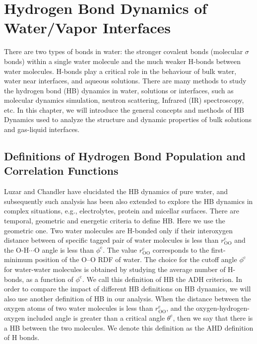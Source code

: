 \chapter{Hydrogen Bond Dynamics of Water/Vapor Interfaces }\label{CHAPTER_HB}
There are two types of bonds in water: the stronger covalent bonds (molecular $\sigma$ bonds) within a single water molecule and 
the much weaker H-bonds between water molecules.
H-bonds play a critical role in the behaviour of bulk water,\cite{Eisenberg1969,Luzar1996,Cabane2005} water near interfaces,\cite{Chowdhary2008} 
and aqueous solutions. \cite{Naslund2005} There are many methods to study the hydrogen bond (HB) dynamics in water, solutions or interfaces, 
such as molecular dynamics simulation,\cite{Tongraar2006,Chanda2006,Tongraar2010,Chowdhary2008,Banerjee2016} neutron scattering, Infrared (IR) spectroscopy,\cite{Werhahn2011,Fournier2016} etc.
In this chapter, we will introduce the general concepts and methods of HB Dynamics \cite{AL96,Luzar1996,DC87} used to analyze the structure 
and dynamic properties of bulk solutions and gas-liquid interfaces. 

\section{Definitions of Hydrogen Bond Population and Correlation Functions}
Luzar and Chandler \cite{AL96} have elucidated the HB dynamics of pure water, and
subsequently such analysis has been also extended to explore the HB dynamics
in complex situations, e.g., electrolytes, \cite{AC00} protein and  micellar surfaces. \cite{SP05}
There are temporal, geometric and energetic criteria to define HB. Here we use the geometric one.
Two water molecules are H-bonded only if their interoxygen distance between of specific tagged pair of water molecules 
is less than $r^{\text{c}}_{\text{OO}}$ and
the O-H$\cdots$O angle is less than $\phi^{\text{c}}$. \cite{AKS86,JT90,SB02} 
The value $r^{\text{c}}_{\text{OO}}$ corresponds to the first-minimum position of the O--O RDF of water. \cite{Sciortino1989}   
The choice for the cutoff angle $\phi^{\text{c}}$ for water-water molecules is obtained by studying the average number of H-bonds,
as a function of $\phi^{\text{c}}$. \cite{Luzar1993} We call this definition of HB the ADH criterion. 
In order to compare the impact of different HB definitions on HB dynamics, we will also use another definition of HB in our analysis. 
When the distance between the oxygen atoms of two water molecules is less than $r^{\text{c}}_{\text{OO}}$, 
and the oxygen-hydrogen-oxygen included angle is greater than a critical angle $\theta^{\text{c}}$, then we say that there is a HB between the two molecules. 
We denote this definition as the AHD definition of H bonds.

